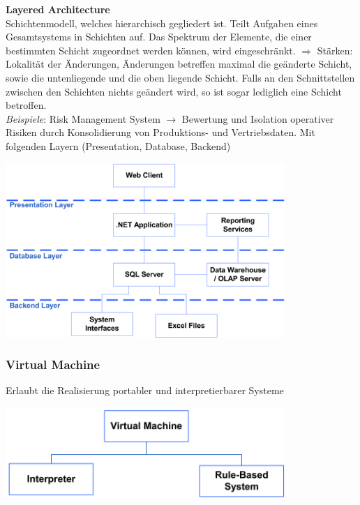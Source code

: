 \documentclass{report}
\newenvironment{Figure}
	{\par\medskip\noindent\minipage{\linewidth}}
	{\endminipage\par\medskip}
\theoremstyle{definition}
\theoremstyle{example}
\begin{document}
\textbf{Layered Architecture}\\
Schichtenmodell, welches hierarchisch gegliedert ist. Teilt Aufgaben eines Gesamtsystems in Schichten auf. Das Spektrum der Elemente, die einer bestimmten Schicht zugeordnet werden können, wird eingeschränkt.
$\Rightarrow$ Stärken: Lokalität der Änderungen, Änderungen betreffen maximal die geänderte Schicht, sowie die untenliegende und die oben liegende Schicht. Falls an den Schnittstellen zwischen den Schichten nichts geändert wird, so ist sogar lediglich eine Schicht betroffen.\\
\textit{Beispiele}: Risk Management System $\rightarrow$ Bewertung und Isolation operativer Risiken durch Konsolidierung von Produktions- und Vertriebsdaten. Mit folgenden Layern (Presentation, Database, Backend)
\begin{Figure}
\centering
\includegraphics[width=400px]{img/LayeredArchitectureBeispiel.png}
	\label{fig:Layered Architecture Beispiel}
\end{Figure}

\subsubsection{Virtual Machine}
Erlaubt die Realisierung portabler und interpretierbarer Systeme
\begin{Figure}
\centering
\includegraphics[width=400px]{img/VM.png}
	\label{fig:Übersicht Virtual Machine}
\end{Figure}
\end{document}
